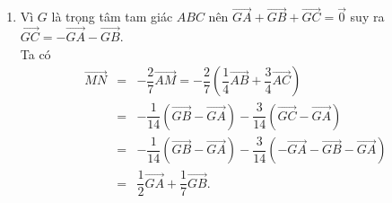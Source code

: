 \begin{bt}
{\begin{enumerate}
			\item Vì $G$ là trọng tâm tam giác $ABC$ nên $\overrightarrow{GA}+\overrightarrow{GB}+\overrightarrow{GC}=\overrightarrow 0 $ suy ra $\overrightarrow{GC}=-\overrightarrow{GA}-\overrightarrow{GB}$.\\
			Ta có 
			\begin{eqnarray*}
				\overrightarrow{MN}&=&-\dfrac{2}{7}\overrightarrow{AM}=-\dfrac{2}{7}\left(\dfrac{1}{4}\overrightarrow{AB}+\dfrac{3}{4}\overrightarrow{AC}\right)\\
				&=&-\dfrac{1}{14}\left(\overrightarrow{GB}-\overrightarrow{GA}\right)-\dfrac{3}{14}\left(\overrightarrow{GC}-\overrightarrow{GA}\right)\\
				&=&-\dfrac{1}{14}\left(\overrightarrow{GB}-\overrightarrow{GA}\right)-\dfrac{3}{14}\left(-\overrightarrow{GA}-\overrightarrow{GB}-\overrightarrow{GA}\right)\\
				&=&\dfrac{1}{2}\overrightarrow{GA}+\dfrac{1}{7}\overrightarrow{GB}.
			\end{eqnarray*}
		\end{enumerate}     
	}  
\end{bt}

